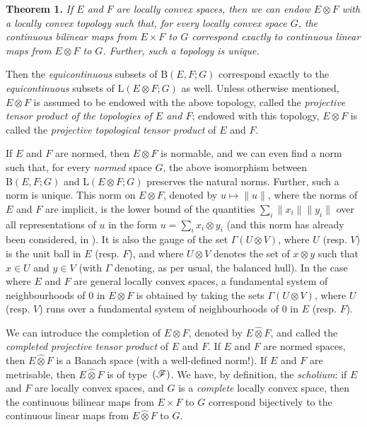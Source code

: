 \documentclass{article}
\theoremstyle{plain}
\newenvironment{itenv}[1]
  {\phantomsection\par\medskip\noindent\textbf{#1.}\itshape}
  {\medskip}
\newcommand{\BB}{\mathrm{B}}
\newcommand{\LL}{\mathrm{L}}
\newcommand{\FF}{\mbox{\normalfont($\mathscr{F}$)}}
\newcommand{\hotimes}{\widehat{\otimes}}
\newcommand{\oldpage}[1]{\marginpar{\footnotesize$\Big\vert$ \textit{p.~#1}}}
\begin{document}
\begin{itenv}{Theorem 1}
\label{1.theorem1}
  If $E$ and $F$ are locally convex spaces, then we can endow $E\otimes F$ with a locally convex topology such that, for every locally convex space $G$, the \emph{continuous} bilinear maps from $E\times F$ to $G$ correspond exactly to \emph{continuous} linear maps from $E\otimes F$ to $G$.
  Further, such a topology is unique.
\end{itenv}

Then the \emph{equicontinuous} subsets of $\BB(E,F;G)$ correspond exactly to the \emph{equicontinuous} subsets of $\LL(E\otimes F;G)$ as well.
Unless otherwise mentioned, $E\otimes F$ is assumed to be endowed with the above topology, called the \emph{projective tensor product of the topologies of $E$ and $F$};
endowed with this topology, $E\otimes F$ is called the \emph{projective topological tensor product} of $E$ and $F$.

If $E$ and $F$ are normed, then $E\otimes F$ is normable, and we can even find a norm such that, for every \emph{normed} space $G$, the above isomorphism between $\BB(E,F;G)$ and $\LL(E\otimes F;G)$ preserves the natural norms.
Further, such a norm is unique.
This norm on $E\otimes F$, denoted by $u\mapsto\|u\|$, where the norms of $E$ and $F$ are implicit, is the lower bound of the quantities $\sum_i\|x_i\|\|y_i\|$ over all representations of $u$ in the form $u=\sum_i x_i\otimes y_i$ (and this norm has already been considered, in \cite{8}).
It is also the gauge of the set $\Gamma(U\otimes V)$, where $U$ (resp. $V$) is the unit ball in $E$ (resp. $F$), and where $U\otimes V$ denotes the set of $x\otimes y$ such that $x\in U$ and $y\in V$
\oldpage{77}
(with $\Gamma$ denoting, as per usual, the balanced hull).
In the case where $E$ and $F$ are general locally convex spaces, a fundamental system of neighbourhoods of $0$ in $E\otimes F$ is obtained by taking the sets $\Gamma(U\otimes V)$, where $U$ (resp. $V$) runs over a fundamental system of neighbourhoods of $0$ in $E$ (resp. $F$).

We can introduce the completion of $E\otimes F$, denoted by $E\hotimes F$, and called the \emph{completed projective tensor product} of $E$ and $F$.
If $E$ and $F$ are normed spaces, then $E\hotimes F$ is a Banach space (with a well-defined norm!).
If $E$ and $F$ are metrisable, then $E\hotimes F$ is of type~$\FF$.
We have, by definition, the \emph{scholium}: if $E$ and $F$ are locally convex spaces, and $G$ is a \emph{complete} locally convex space, then the continuous bilinear maps from $E\times F$ to $G$ correspond bijectively to the continuous linear maps from $E\hotimes F$ to $G$.
\end{document}
